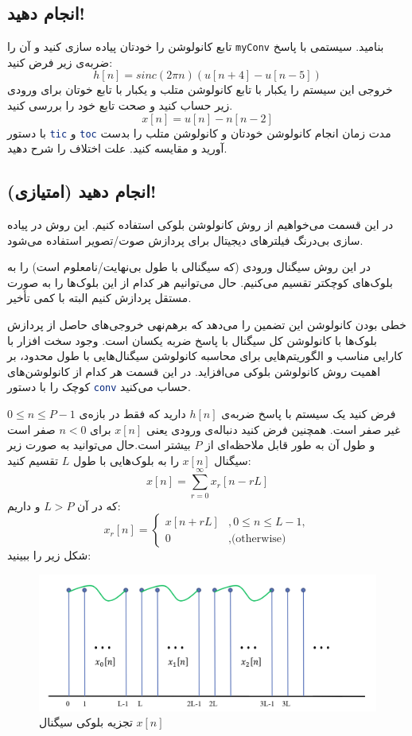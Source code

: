 \documentclass{utsignal}
\begin{document}
	\subsection{انجام دهید!}
	تابع کانولوشن را خودتان پیاده سازی کنید و آن را \lstinline[language=Octave]{myConv} بنامید.
	سیستمی با پاسخ ضربه‌ی زیر فرض کنید:
	$$
	h[n] = sinc(2\pi n) (u[n + 4] - u[n - 5])
	$$
	خروجی این سیستم را یکبار با تابع کانولوشن متلب و یکبار با تابع خوتان برای ورودی زیر حساب کنید و صحت تابع خود را بررسی کنید.
	$$
	x[n]=u[n]-n[n-2]
	$$
	با دستور \lstinline[language=Octave]{tic} و \lstinline[language=Octave]{toc} مدت زمان انجام کانولوشن خودتان و کانولوشن متلب را بدست آورید و مقایسه کنید. علت اختلاف را شرح دهید.
	\subsection{انجام دهید (امتیازی)!}
	در این قسمت می‌خواهیم از روش کانولوشن بلوکی استفاده کنیم. این روش در پیاده سازی بی‌درنگ فیلترهای دیجیتال برای پردازش صوت/تصویر استفاده می‌شود.

	در این روش سیگنال ورودی (که سیگنالی با طول بی‌نهایت/نامعلوم است) را به بلوک‌های کوچکتر تقسیم می‌کنیم. حال می‌توانیم هر کدام از این بلوک‌ها را به صورت مستقل پردازش کنیم البته با کمی تأخیر. 
	
	خطی بودن کانولوشن این تضمین را می‌دهد که برهم‌نهی  خروجی‌های حاصل از پردازش بلوک‌ها با کانولوشن کل سیگنال با پاسخ ضربه یکسان است. وجود سخت افزار با کارایی مناسب و الگوریتم‌‌هایی برای محاسبه کانولوشن سیگنال‌هایی با طول محدود، بر اهمیت روش کانولوشن بلوکی ‌می‌افزاید. در این قسمت هر کدام از کانولوشن‌های کوچک را با دستور \lstinline[language=Octave]{conv} حساب می‌کنید.
	
	فرض کنید یک سیستم با پاسخ ضربه‌ی $h[n]$ دارید که فقط در بازه‌ی $0\le n \le P-1$ غیر صفر است. همچنین فرض کنید دنباله‌ی ورودی یعنی $x[n]$ برای $n<0$ صفر است و طول آن به طور قابل ملاحظه‌ای از $P$ بیشتر است.حال می‌توانید به صورت زیر سیگنال $x[n]$ را به بلوک‌هایی با طول $L$ تقسیم کنید:
	$$
	x[n] = \sum_{r=0}^{\infty}x_r[n-rL]
	$$
	که در آن $L>P$ و داریم:
	$$
	x_r[n]=\begin{cases}
		x[n+rL]&, 0 \le n \le L-1,\\
		0&, \text{(otherwise)}
	\end{cases}
	$$
	شکل زیر را ببینید:
	\begin{figure}[h]
		\includegraphics[width=\linewidth]{segments.png}
		\caption{تجزیه بلوکی سیگنال $x[n]$}
	\end{figure}
	
\end{document}
